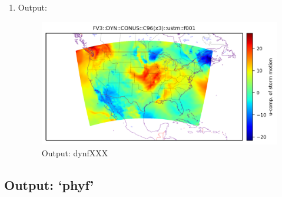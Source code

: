 \documentclass[11pt,fleqn]{report}              %
\begin{document}
\begin{enumerate}
\item Output:

\begin{figure}[ht!]
  \centering
  \includegraphics[width=0.8\linewidth]{fv3_out_dyn_CONUS_C96_ustm_f001.png}
  \caption{Output: dynfXXX}
  \label{fig:py_out_dyn}
\end{figure}

\end{enumerate}



\subsection{Output: `phyf'}
\label{subsec:python_phyf}
\end{document}

